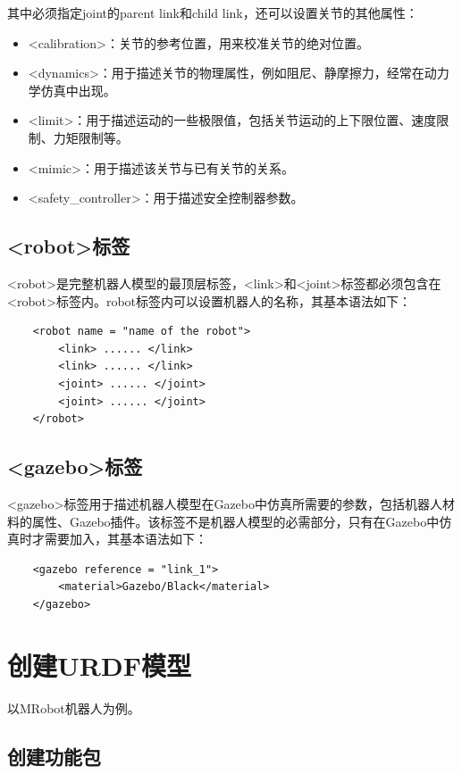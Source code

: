 \documentclass[10pt, oneside]{book}
\begin{document}
其中必须指定joint的parent link和child link，还可以设置关节的其他属性：

\begin{itemize}
    \item <calibration>：关节的参考位置，用来校准关节的绝对位置。
    \item <dynamics>：用于描述关节的物理属性，例如阻尼、静摩擦力，经常在动力学仿真中出现。
    \item <limit>：用于描述运动的一些极限值，包括关节运动的上下限位置、速度限制、力矩限制等。
    \item <mimic>：用于描述该关节与已有关节的关系。
    \item <safety\_controller>：用于描述安全控制器参数。
\end{itemize}

\subsection{<robot>标签}

<robot>是完整机器人模型的最顶层标签，<link>和<joint>标签都必须包含在<robot>标签内。robot标签内可以设置机器人的名称，其基本语法如下：

\begin{verbatim}
    <robot name = "name of the robot">
        <link> ...... </link>
        <link> ...... </link>
        <joint> ...... </joint>
        <joint> ...... </joint>
    </robot>
\end{verbatim}

\subsection{<gazebo>标签}

<gazebo>标签用于描述机器人模型在Gazebo中仿真所需要的参数，包括机器人材料的属性、Gazebo插件。该标签不是机器人模型的必需部分，只有在Gazebo中仿真时才需要加入，其基本语法如下：

\begin{verbatim}
    <gazebo reference = "link_1">
        <material>Gazebo/Black</material>
    </gazebo>
\end{verbatim}

\section{创建URDF模型}

以MRobot机器人为例。

\subsection{创建功能包}
\end{document}
